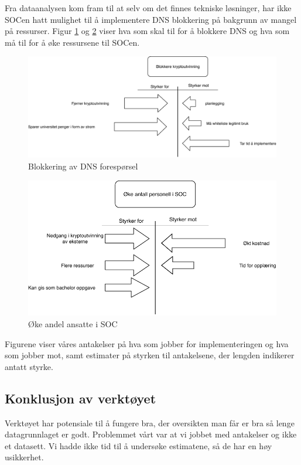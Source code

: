 Fra dataanalysen kom fram til at selv om det finnes tekniske løsninger, har ikke SOCen hatt mulighet til å implementere DNS blokkering på bakgrunn av mangel på ressurser. Figur \ref{fig:Blokkering} og \ref{fig:Oke-antall} viser hva som skal til for å blokkere DNS og hva som må til for å øke ressursene til SOCen.    
 \begin{figure}[H]
    \centering
    \includegraphics[scale=0.6]{case_3/bilder/Force-Field3.pdf}
    \caption[Blokkering]{Blokkering av DNS forespørsel}
    \label{fig:Blokkering}
\end{figure}

 \begin{figure}[H]
    \hspace{3.6cm}
    \includegraphics[scale=0.6]{case_3/bilder/Force-field4.pdf}
    \caption[Øke antall ansette i SOC]{Øke andel ansatte i SOC}
    \label{fig:Oke-antall}
\end{figure}

Figurene viser våres antakelser på hva som jobber for implementeringen og hva som jobber mot, samt estimater på styrken til antakelsene, der lengden indikerer antatt styrke. 

\subsection{Konklusjon av verktøyet}
Verktøyet har potensiale til å fungere bra, der oversikten man får er bra så lenge datagrunnlaget er godt. Problemmet vårt var at vi jobbet med antakelser og ikke et datasett. Vi hadde ikke tid til å undersøke estimatene, så de har en høy usikkerhet.     
